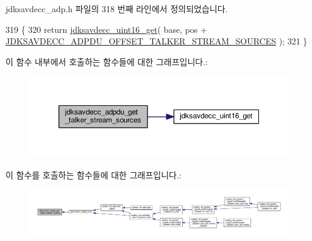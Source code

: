 jdksavdecc\+\_\+adp.\+h 파일의 318 번째 라인에서 정의되었습니다.


\begin{DoxyCode}
319 \{
320     \textcolor{keywordflow}{return} \hyperlink{group__endian_ga3fbbbc20be954aa61e039872965b0dc9}{jdksavdecc\_uint16\_get}( base, pos + 
      \hyperlink{group__adpdu_ga45a657e4509e4e723eb0fd534c77c759}{JDKSAVDECC\_ADPDU\_OFFSET\_TALKER\_STREAM\_SOURCES} );
321 \}
\end{DoxyCode}


이 함수 내부에서 호출하는 함수들에 대한 그래프입니다.\+:
\nopagebreak
\begin{figure}[H]
\begin{center}
\leavevmode
\includegraphics[width=350pt]{group__adpdu_ga49981096210a18c343e4dae1f108ab28_cgraph}
\end{center}
\end{figure}




이 함수를 호출하는 함수들에 대한 그래프입니다.\+:
\nopagebreak
\begin{figure}[H]
\begin{center}
\leavevmode
\includegraphics[width=350pt]{group__adpdu_ga49981096210a18c343e4dae1f108ab28_icgraph}
\end{center}
\end{figure}


